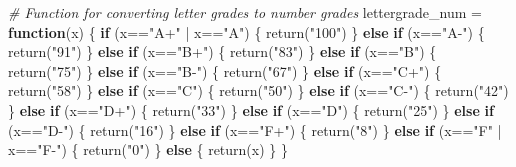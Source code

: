 \documentclass[
  11pt,
]{article}
\newenvironment{Shaded}{\begin{snugshade}}{\end{snugshade}}
\newcommand{\CommentTok}[1]{\textcolor[rgb]{0.56,0.35,0.01}{\textit{#1}}}
\newcommand{\ControlFlowTok}[1]{\textcolor[rgb]{0.13,0.29,0.53}{\textbf{#1}}}
\newcommand{\FunctionTok}[1]{\textcolor[rgb]{0.00,0.00,0.00}{#1}}
\newcommand{\NormalTok}[1]{#1}
\newcommand{\OtherTok}[1]{\textcolor[rgb]{0.56,0.35,0.01}{#1}}
\newcommand{\SpecialCharTok}[1]{\textcolor[rgb]{0.00,0.00,0.00}{#1}}
\newcommand{\StringTok}[1]{\textcolor[rgb]{0.31,0.60,0.02}{#1}}
\begin{document}
\begin{Shaded}
\begin{Highlighting}[]
\CommentTok{\# Function for converting letter grades to number grades}
\NormalTok{lettergrade\_num }\OtherTok{=} \ControlFlowTok{function}\NormalTok{(x) \{}
  \ControlFlowTok{if}\NormalTok{ (x}\SpecialCharTok{==}\StringTok{"A+"} \SpecialCharTok{|}\NormalTok{ x}\SpecialCharTok{==}\StringTok{"A"}\NormalTok{) \{}
    \FunctionTok{return}\NormalTok{(}\StringTok{"100"}\NormalTok{)}
\NormalTok{  \} }\ControlFlowTok{else} \ControlFlowTok{if}\NormalTok{ (x}\SpecialCharTok{==}\StringTok{"A{-}"}\NormalTok{) \{}
    \FunctionTok{return}\NormalTok{(}\StringTok{"91"}\NormalTok{)}
\NormalTok{  \} }\ControlFlowTok{else} \ControlFlowTok{if}\NormalTok{ (x}\SpecialCharTok{==}\StringTok{"B+"}\NormalTok{) \{}
    \FunctionTok{return}\NormalTok{(}\StringTok{"83"}\NormalTok{)}
\NormalTok{  \} }\ControlFlowTok{else} \ControlFlowTok{if}\NormalTok{ (x}\SpecialCharTok{==}\StringTok{"B"}\NormalTok{) \{}
    \FunctionTok{return}\NormalTok{(}\StringTok{"75"}\NormalTok{)}
\NormalTok{  \} }\ControlFlowTok{else} \ControlFlowTok{if}\NormalTok{ (x}\SpecialCharTok{==}\StringTok{"B{-}"}\NormalTok{) \{}
    \FunctionTok{return}\NormalTok{(}\StringTok{"67"}\NormalTok{)}
\NormalTok{  \} }\ControlFlowTok{else} \ControlFlowTok{if}\NormalTok{ (x}\SpecialCharTok{==}\StringTok{"C+"}\NormalTok{) \{}
    \FunctionTok{return}\NormalTok{(}\StringTok{"58"}\NormalTok{)}
\NormalTok{  \} }\ControlFlowTok{else} \ControlFlowTok{if}\NormalTok{ (x}\SpecialCharTok{==}\StringTok{"C"}\NormalTok{) \{}
    \FunctionTok{return}\NormalTok{(}\StringTok{"50"}\NormalTok{)}
\NormalTok{  \} }\ControlFlowTok{else} \ControlFlowTok{if}\NormalTok{ (x}\SpecialCharTok{==}\StringTok{"C{-}"}\NormalTok{) \{}
    \FunctionTok{return}\NormalTok{(}\StringTok{"42"}\NormalTok{)}
\NormalTok{  \} }\ControlFlowTok{else} \ControlFlowTok{if}\NormalTok{ (x}\SpecialCharTok{==}\StringTok{"D+"}\NormalTok{) \{}
    \FunctionTok{return}\NormalTok{(}\StringTok{"33"}\NormalTok{)}
\NormalTok{  \} }\ControlFlowTok{else} \ControlFlowTok{if}\NormalTok{ (x}\SpecialCharTok{==}\StringTok{"D"}\NormalTok{) \{}
    \FunctionTok{return}\NormalTok{(}\StringTok{"25"}\NormalTok{)}
\NormalTok{  \} }\ControlFlowTok{else} \ControlFlowTok{if}\NormalTok{ (x}\SpecialCharTok{==}\StringTok{"D{-}"}\NormalTok{) \{}
    \FunctionTok{return}\NormalTok{(}\StringTok{"16"}\NormalTok{)}
\NormalTok{  \} }\ControlFlowTok{else} \ControlFlowTok{if}\NormalTok{ (x}\SpecialCharTok{==}\StringTok{"F+"}\NormalTok{) \{}
    \FunctionTok{return}\NormalTok{(}\StringTok{"8"}\NormalTok{)}
\NormalTok{  \} }\ControlFlowTok{else} \ControlFlowTok{if}\NormalTok{ (x}\SpecialCharTok{==}\StringTok{"F"} \SpecialCharTok{|}\NormalTok{ x}\SpecialCharTok{==}\StringTok{"F{-}"}\NormalTok{) \{}
    \FunctionTok{return}\NormalTok{(}\StringTok{"0"}\NormalTok{)}
\NormalTok{  \} }\ControlFlowTok{else}\NormalTok{ \{}
    \FunctionTok{return}\NormalTok{(x)}
\NormalTok{  \}}
\NormalTok{\}}


\end{Highlighting}
\end{Shaded}
\end{document}
